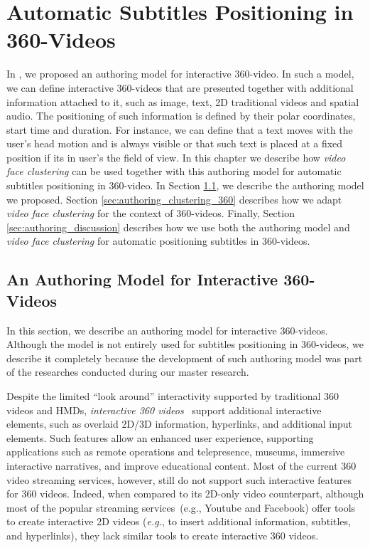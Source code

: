 \newpage
\chapter{Automatic Subtitles Positioning in 360-Videos}
\label{chap:subtitles_positioning}

In \cite{mendes2020authoring}, we proposed an authoring model for interactive 360-video. In such a model, we can define interactive 360-videos that are presented together with additional information attached to it, such as image, text, 2D traditional videos and spatial audio. The positioning of such information is defined by their polar coordinates, start time and duration. For instance, we can define that a text moves with the user's head motion and is always visible or that such text is placed at a fixed position if its in user's the field of view. In this chapter we describe how \emph{video face clustering} can be used together with this authoring model for automatic subtitles positioning in 360-video. In Section \ref{sec:authoring_model}, we describe the authoring model we proposed. Section \ref{sec:authoring_clustering_360} describes how we adapt \emph{video face clustering} for the context of 360-videos. Finally, Section \ref{sec:authoring_discussion} describes how we use both the authoring model and \emph{video face clustering} for automatic positioning subtitles in 360-videos.

\section{An Authoring Model for Interactive 360-Videos}
\label{sec:authoring_model}

In this section, we describe an authoring model for interactive 360-videos. Although the model is not entirely used for subtitles positioning in 360-videos, we describe it completely because the development of such authoring model was part of the researches conducted during our master research.

Despite the limited ``look around'' interactivity supported by traditional 360
videos and HMDs, \emph{interactive 360
videos}~\cite{chambel2011,berning2013parnorama} support additional interactive
elements, such as overlaid 2D/3D information, hyperlinks, and additional input
elements.
Such features allow an enhanced user experience, supporting applications such
as remote operations and telepresence, museums, immersive interactive
narratives, and improve educational content.
Most of the current 360 video streaming services, however, still do not
support such interactive features for 360 videos.
Indeed, when compared to its 2D-only video counterpart, although most of the
popular streaming services~(e.g., Youtube and Facebook) offer tools to create
interactive 2D videos (\emph{e.g.}, to insert additional information,
subtitles, and hyperlinks), they lack similar tools to create interactive 360
videos.

